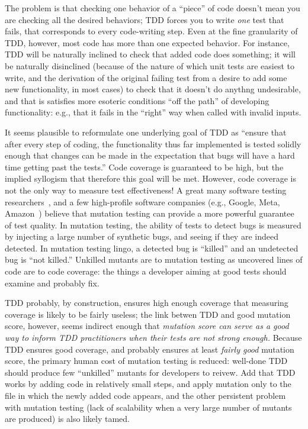 \documentclass[sigplan,screen]{acmart}
\begin{document}
The problem is that checking one behavior of a ``piece'' of code
doesn't mean you are checking all the desired behaviors; TDD forces
you to write \emph{one} test that fails, that corresponds to every
code-writing step.  Even at the fine granularity of TDD, however, most
code has more than one expected behavior.  For instance, TDD will be
naturally inclined to check that added code does something; it will be
naturally disinclined (because of the nature of which unit tests are
easiest to write, and the
derivation of the original failing test from a desire to add some new
functionality, in most cases) to check that it doesn't do anythng
undesirable, and that is satisfies more esoteric conditions ``off the
path'' of developing functionality: e.g., that it fails in the ``right'' way when called with
invalid inputs.

It seems plausible to reformulate one underlying goal of TDD as
``ensure that after every step of coding, the functionality thus far
implemented is tested solidly enough that changes can be made in the
expectation that bugs will have a hard time getting past the tests.''
Code coverage is guaranteed to be high, but the implied syllogism that
therefore this goal will be met.  However, code coverage is not the
only way to measure test effectiveness!  A great many software testing
researchers~\cite{}, and a few high-profile software companies (e.g., Google,
Meta, Amazon~\cite{}) believe that mutation testing can provide a more
powerful guarantee of test quality.  In mutation testing, the ability
of tests to detect bugs is measured by injecting a large number of
synthetic bugs, and seeing if they are indeed detected.  In mutation
testing lingo, a detected bug is ``killed'' and an undetected bug is
``not killed.''  Unkilled mutants are to mutation testing as uncovered
lines of code are to code coverage:  the things a developer aiming at
good tests should examine and probably fix.

TDD probably, by construction, ensures high enough coverage that
measuring coverage is likely to be fairly useless; the link betwen TDD
and good mutation score, however, seems indirect enough that
\emph{mutation score can serve as a good way to inform TDD
  practitioners when their tests are not strong enough.}   Because TDD
ensures good coverage, and probably ensures at least \emph{fairly
  good} mutation score, the primary human cost of mutation testing is
reduced:  well-done TDD should produce few ``unkilled'' mutants for
developers to reivew.  Add that TDD works by adding code in relatively
small steps, and apply mutation only to the file in which the newly
added code appears, and the other persistent problem with mutation testing (lack of
scalability when a very large number of mutants are produced) is also
likely tamed.



\end{document}

